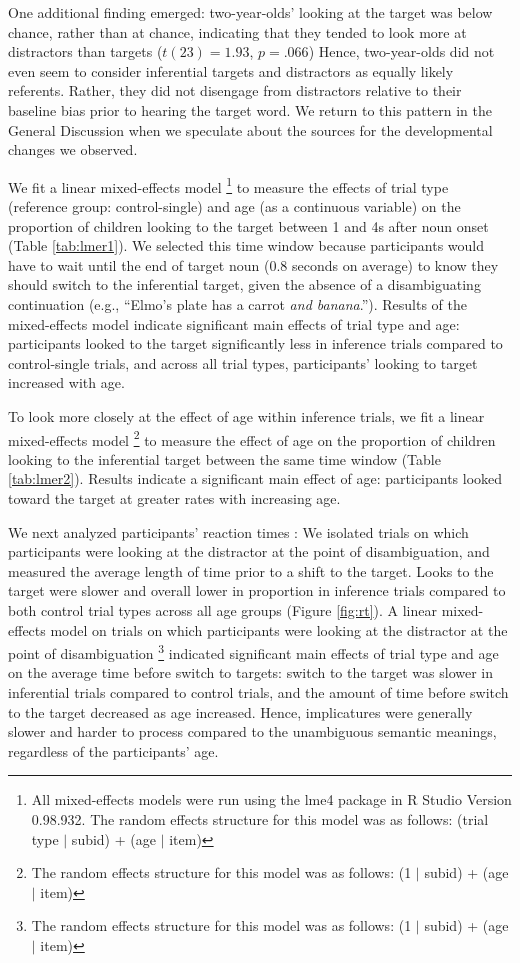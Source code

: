 \documentclass[10pt,letterpaper]{article}
\begin{document}
One additional finding emerged: two-year-olds' looking at the target was below chance, rather than at chance, indicating that they tended to look more at distractors than targets ($t(23)  = 1.93$, $p = .066$) Hence, two-year-olds did not even seem to consider inferential targets and distractors as equally likely referents. Rather, they did not disengage from distractors relative to their baseline bias prior to hearing the target word. We return to this pattern in the General Discussion when we speculate about the sources for the developmental changes we observed. 

We fit a linear mixed-effects model \footnote{All mixed-effects models were run using the lme4 package in R Studio Version 0.98.932. The random effects structure for this model was as follows: (trial type $|$ subid) + (age $|$ item)} to measure the effects of trial type (reference group: control-single) and age (as a continuous variable) on the proportion of children looking to the target between 1 and 4s after noun onset (Table \ref{tab:lmer1}). We selected this time window because participants would have to wait until the end of target noun (0.8 seconds on average) to know they should switch to the inferential target, given the absence of a disambiguating continuation (e.g., ``Elmo's plate has a carrot \emph{and banana}.''). Results of the mixed-effects model indicate significant main effects of trial type and age: participants looked to the target significantly less in inference trials compared to control-single trials, and across all trial types, participants' looking to target increased with age. 

To look more closely at the effect of age within inference trials, we fit a linear mixed-effects model \footnote{The random effects structure for this model was as follows: (1 $|$ subid) + (age $|$ item)} to measure the effect of age on the proportion of children looking to the inferential target between the same time window (Table \ref{tab:lmer2}). Results indicate a significant main effect of age: participants looked toward the target at greater rates with increasing age.

We next analyzed participants' reaction times \cite{fernald2008looking}: We isolated trials on which participants were looking at the distractor at the point of disambiguation, and measured the average length of time prior to a shift to the target. Looks to the target were slower and overall lower in proportion in inference trials compared to both control trial types across all age groups (Figure \ref{fig:rt}). A linear mixed-effects model on trials on which participants were looking at the distractor at the point of disambiguation \footnote{The random effects structure for this model was as follows: (1 $|$ subid) + (age $|$ item)} indicated significant main effects of trial type and age on the average time before switch to targets: switch to the target was slower in inferential trials compared to control trials, and the amount of time before switch to the target decreased as age increased. Hence, implicatures were generally slower and harder to process compared to the unambiguous semantic meanings, regardless of the participants' age. 
\end{document}
